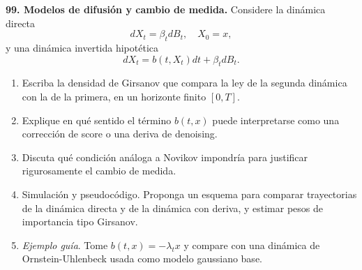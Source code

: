 \documentclass[11pt, letterpaper]{article}
\begin{document}
\begin{ejercicio}
    \textbf{99. Modelos de difusión y cambio de medida.} Considere la dinámica directa
    \[ dX_{t}=\beta_{t}dB_{t}, \quad X_{0}=x, \]
    y una dinámica invertida hipotética
    \[ dX_{t}=b(t,X_{t})dt+\beta_{t}dB_{t}. \]
    \begin{enumerate}
        \item Escriba la densidad de Girsanov que compara la ley de la segunda dinámica con la de la primera, en un horizonte finito $[0,T]$.
        \item Explique en qué sentido el término $b(t,x)$ puede interpretarse como una corrección de score o una deriva de denoising.
        \item Discuta qué condición análoga a Novikov impondría para justificar rigurosamente el cambio de medida.
        \item Simulación y pseudocódigo. Proponga un esquema para comparar trayectorias de la dinámica directa y de la dinámica con deriva, y estimar pesos de importancia tipo Girsanov.
        \item \textit{Ejemplo guía}. Tome $b(t,x)=-\lambda_{t}x$ y compare con una dinámica de Ornstein-Uhlenbeck usada como modelo gaussiano base.
    \end{enumerate}
\end{ejercicio}

\vspace{5mm}
\end{document}
